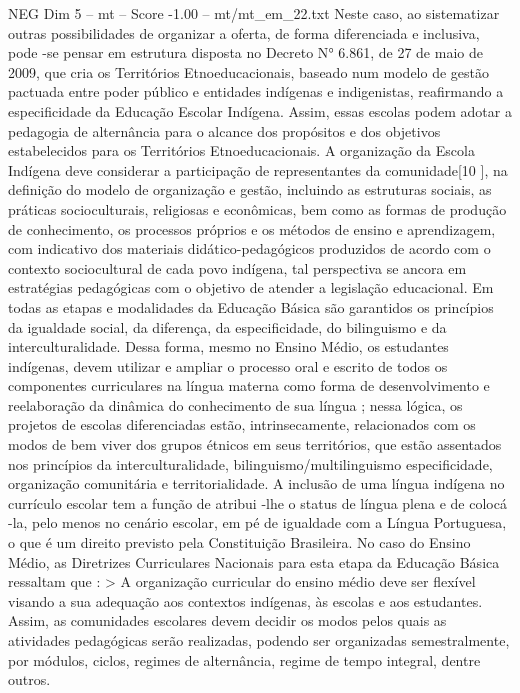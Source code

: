 \begin{textsample}{NEG Dim 5 – mt – Score -1.00 – mt/mt\_em\_22.txt}
Neste caso, ao sistematizar outras possibilidades de organizar a oferta, de forma diferenciada e inclusiva, pode -se pensar em estrutura disposta no Decreto N{\EmojiFont °} 6.861, de 27 de maio de 2009, que cria os Territórios Etnoeducacionais, baseado num modelo de gestão pactuada entre poder público e entidades indígenas e indigenistas, reafirmando a especificidade da Educação Escolar Indígena.
Assim, essas escolas podem adotar a pedagogia de alternância para o alcance dos propósitos e dos objetivos estabelecidos para os Territórios Etnoeducacionais.
A organização da Escola Indígena deve considerar a participação de representantes da comunidade[10 ], na definição do modelo de organização e gestão, incluindo as estruturas sociais, as práticas socioculturais, religiosas e econômicas, bem como as formas de produção de conhecimento, os processos próprios e os métodos de ensino e aprendizagem, com indicativo dos materiais didático-pedagógicos produzidos de acordo com o contexto sociocultural de cada povo indígena, tal perspectiva se ancora em estratégias pedagógicas com o objetivo de atender a legislação educacional.
Em todas as etapas e modalidades da Educação Básica são garantidos os princípios da igualdade social, da diferença, da especificidade, do bilinguismo e da interculturalidade.
Dessa forma, mesmo no Ensino Médio, os estudantes indígenas, devem utilizar e ampliar o processo oral e escrito de todos os componentes curriculares na língua materna como forma de desenvolvimento e reelaboração da dinâmica do conhecimento de sua língua ; nessa lógica, os projetos de escolas diferenciadas estão, intrinsecamente, relacionados com os modos de bem viver dos grupos étnicos em seus territórios, que estão assentados nos princípios da interculturalidade, bilinguismo/multilinguismo especificidade, organização comunitária e territorialidade.
A inclusão de uma língua indígena no currículo escolar tem a função de atribui -lhe o status de língua plena e de colocá -la, pelo menos no cenário escolar, em pé de igualdade com a Língua Portuguesa, o que é um direito previsto pela Constituição Brasileira.
No caso do Ensino Médio, as Diretrizes Curriculares Nacionais para esta etapa da Educação Básica ressaltam que : > A organização curricular do ensino médio deve ser flexível visando a sua adequação aos contextos indígenas, às escolas e aos estudantes.
Assim, as comunidades escolares devem decidir os modos pelos quais as atividades pedagógicas serão realizadas, podendo ser organizadas semestralmente, por módulos, ciclos, regimes de alternância, regime de tempo integral, dentre outros.

\end{textsample}
